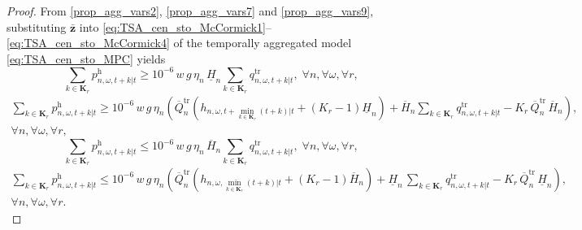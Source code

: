 \documentclass[a4paper,fleqn]{cas-sc}
\begin{document}
\begin{proof}
From \eqref{prop_agg_vars2}, \eqref{prop_agg_vars7} and \eqref{prop_agg_vars9},
substituting $\boldsymbol{\bar{z}}$ into
\eqref{eq:TSA_cen_sto_McCormick1}--\eqref{eq:TSA_cen_sto_McCormick4}
of the temporally aggregated model \eqref{eq:TSA_cen_sto_MPC} yields
\begin{equation}
\sum_{k \in \boldsymbol{K}_r} p^{\mathrm{h}}_{n,\omega,t+k|t}
\geq
10^{-6} \, w \, g \, \eta_n \, \underline{H}_{n} \sum_{k \in \boldsymbol{K}_r} q^{\mathrm{tr}}_{n,\omega,t+k|t},
\; \forall n, \forall \omega, \forall r, 
\label{prop:TSA_cen_sto_McCormick1}
\end{equation}
\begin{multline}
\sum_{k \in \boldsymbol{K}_r} p^{\mathrm{h}}_{n,\omega,t+k|t}
\geq
10^{-6} \, w \, g \, \eta_n \left(
\overline{Q}^{\mathrm{tr}}_{n}
\left(h_{n,\omega,t+\min_{k \in \boldsymbol{K}_r}(t+k)|t} + \left(K_r - 1\right) \underline{H}_n\right)
+ \overline{H}_{n} \sum_{k \in \boldsymbol{K}_r} q^{\mathrm{tr}}_{n, \omega, t+k|t} - K_r \, \overline{Q}^{\mathrm{tr}}_{n}  \, \overline{H}_{n}\right),\\
\forall n, \forall \omega, \forall r, 
\label{prop:TSA_cen_sto_McCormick2}
\end{multline}
\begin{equation}
\sum_{k \in \boldsymbol{K}_r} p^{\mathrm{h}}_{n,\omega,t+k|t}
\leq
10^{-6} \, w \, g \, \eta_n \, \overline{H}_{n} \sum_{k \in \boldsymbol{K}_r} q^{\mathrm{tr}}_{n,\omega,t+k|t},
\; \forall n, \forall \omega, \forall r,
\label{prop:TSA_cen_sto_McCormick3}
\end{equation}
\begin{multline}
\sum_{k \in \boldsymbol{K}_r} p^{\mathrm{h}}_{n,\omega,t+k|t}
\leq
10^{-6} \, w \, g \, \eta_n \left(\overline{Q}^{\mathrm{tr}}_{n}
\left(
h_{n, \omega, \min_{k \in \boldsymbol{K}_r}(t+k)|t} + \left(K_r - 1\right) \overline{H}_n
\right)
+ \underline{H}_{n} \, \sum_{k \in \boldsymbol{K}_r} q^{\mathrm{tr}}_{n, \omega, t+k|t} - K_r \,\overline{Q}^{\mathrm{tr}}_n \, \underline{H}_{n}\right), \\
\forall n, \forall \omega, \forall r.
\label{prop:TSA_cen_sto_McCormick4}
\end{multline}


\end{proof}
\end{document}
